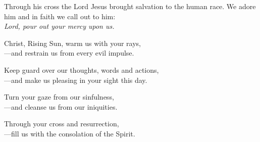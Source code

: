 \intercessions

\begin{raggedright}
Through his cross the Lord Jesus brought salvation to the human race. We adore him and in faith we call out to him:\\
\emph{Lord, pour out your mercy upon us.}

\medskip
Christ, Rising Sun, warm us with your rays,\\
{\color{red}---}and restrain us from every evil impulse.

\medskip
Keep guard over our thoughts, words and actions,\\
{\color{red}---}and make us pleasing in your sight this day.

\medskip
Turn your gaze from our sinfulness,\\
{\color{red}---}and cleanse us from our iniquities.

\medskip
Through your cross and resurrection,\\
{\color{red}---}fill us with the consolation of the Spirit.
\end{raggedright}